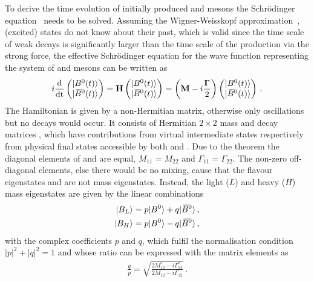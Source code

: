 To derive the time evolution of initially produced \Bd and \Bdb mesons the
Schrödinger equation~\cite{Schroedinger} needs to be solved. Assuming the
Wigner-Weisskopf approximation~\cite{Weisskopf:1930au,*Weisskopf:1930ps}, \ie
(excited) states do not know about their past, which is valid since the time
scale of weak decays is significantly larger than the time scale of the
production via the strong force, the effective Schrödinger equation for the
wave function representing the system of \Bd and \Bdb mesons can be written as
\begin{align}
	i \frac{\mathrm{d}}{\mathrm{dt}}
\begin{pmatrix}
	|{{B}^0}(t)\rangle	\\	|{{\kern 0.18em\overline{\kern -0.18em B}{}}{}^0}(t)\rangle	
\end{pmatrix}
	= \mathbf{H}
\begin{pmatrix}
	|{{B}^0}(t)\rangle	\\	|{{\kern 0.18em\overline{\kern -0.18em B}{}}{}^0}(t)\rangle	
\end{pmatrix}
	= \left(\mathbf{M} - i \frac{\mathbf{\Gamma}}{2}\right)
\begin{pmatrix}
	|{{B}^0}(t)\rangle	\\	|{{\kern 0.18em\overline{\kern -0.18em B}{}}{}^0}(t)\rangle
\end{pmatrix}
\,.
\end{align}
The Hamiltonian  is given by a non-Hermitian matrix, otherwise only
oscillations but no decays would occur. It consists of Hermitian $2\times2$
mass  and decay matrices \matr{\Gamma}, which have contributions from
virtual intermediate states respectively from physical final states accessible
by both \Bd and \Bdb. Due to the \CPT theorem the diagonal elements of
 and \matr{\Gamma} are equal, \ie $M_{11} = M_{22}$ and $\Gamma_{11} =
\Gamma_{22}$. The non-zero off-diagonal elements, else there would be no
mixing, cause that the flavour eigenstates \Bd and \Bdb are not mass
eigenstates. Instead, the light ($L$) and heavy ($H$) mass eigenstates are
given by the linear combinations
\begin{align}
\begin{split}
	|B_L\rangle = p |{{B}^0}\rangle + q |{{\kern 0.18em\overline{\kern -0.18em B}{}}{}^0}\rangle \,,\\
	|B_H\rangle = p |{{B}^0}\rangle - q |{{\kern 0.18em\overline{\kern -0.18em B}{}}{}^0}\rangle \,,
\end{split}
\label{eq:cpviolation:neutralBmesons:superposition}
\end{align}
with the complex coefficients $p$ and $q$, which fulfil the normalisation
condition $|p|^2 + |q|^2 = 1$ and whose ratio can be expressed with the matrix
elements as
\begin{align}
	\frac qp = \sqrt{\frac{2M_{12}^\ast - i\Gamma_{12}^\ast}{2M_{12} - i\Gamma_{12}}}\,.
\end{align}
